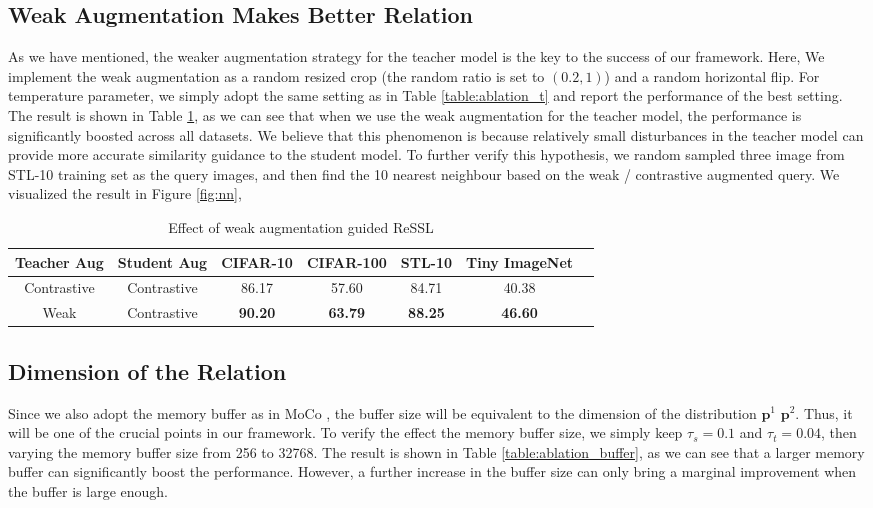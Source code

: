 \documentclass{article}
\newcommand{\<}{\left\langle}
\renewcommand{\>}{\right\rangle}
\begin{document}
\subsection{Weak Augmentation Makes Better Relation}
As we have mentioned, the weaker augmentation strategy for the teacher model is the key to the success of our framework. Here, We implement the weak augmentation as a random resized crop (the random ratio is set to $(0.2, 1)$) and a random horizontal flip.  For temperature parameter, we simply adopt the same setting as in Table \ref{table:ablation_t} and report the performance of the best setting. The result is shown in Table \ref{table:ablation_weakaug}, as we can see that when we use the weak augmentation for the teacher model, the performance is significantly boosted across all datasets. We believe that this phenomenon is because relatively small disturbances in the teacher model can provide more accurate similarity guidance to the student model. To further verify this hypothesis, we random sampled three image from STL-10 training set as the query images, and then find the 10 nearest neighbour based on the weak / contrastive augmented query. We visualized the result in Figure \ref{fig:nn}, 

\renewcommand\arraystretch{1.15}
\begin{table}[h]
 \centering
 \setlength\tabcolsep{5pt}
 \small
 \vspace{-5pt}
 \caption{Effect of weak augmentation guided ReSSL }
 \vspace{-5pt}
 \label{table:ablation_weakaug}
\begin{tabular}{c c c c c c c } 
\toprule 
Teacher Aug & Student Aug & CIFAR-10 & CIFAR-100 & STL-10 & Tiny ImageNet \\ \hline
Contrastive & Contrastive  & 86.17 & 57.60 & 84.71 & 40.38 \\
Weak   & Contrastive  & \textbf{90.20} & \textbf{63.79} & \textbf{88.25} & \textbf{46.60}   \\ \hline
\toprule 
\end{tabular}
\vspace{-15pt}
\end{table}


\subsection{Dimension of the Relation}
Since we also adopt the memory buffer as in MoCo \cite{moco}, the buffer size will be equivalent to the dimension of the distribution $\mathbf{p}^1$ $\mathbf{p}^2$. Thus, it will be one of the crucial points in our framework. To verify the effect the memory buffer size, we simply keep $\tau_s = 0.1$ and $\tau_t = 0.04$, then varying the memory buffer size from 256 to 32768. The result is shown in Table \ref{table:ablation_buffer}, as we can see that a larger memory buffer can significantly boost the performance. However, a further increase in the buffer size can only bring a marginal improvement when the buffer is large enough.
\end{document}
